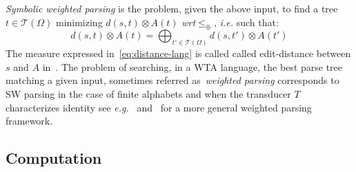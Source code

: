 \documentclass[runningheads]{llncs}
\def\ie{\textit{i.e.}\xspace}
\def\eg{\textit{e.g.}\xspace}
\def\wrt{\textit{wrt}\xspace}
\def\<#1>{\langle #1 \rangle}
\newcommand{\T}{\mathcal{T}}
\newcommand{\zero}{\mathbb{0}}
\newcommand{\one}{\mathbb{1}}
\def\SWTA{\textsf{swTA}\xspace}
\def\SWVPA{\textsf{sw-VPA}\xspace}
\def\wei{\mathsf{w}}
\def\Omegai{{\Omega_\mathsf{i}}}
\def\Omegac{{\Omega_\mathsf{c}}}
\def\Omegar{{\Omega_\mathsf{r}}}
\begin{document}
\noindent 
\emph{Symbolic weighted parsing} is the problem, 
given the above input, 
to find a tree $t \in \T(\Omega)$ %
minimizing \( d(s, t) \otimes A(t)\)
\wrt $\leq_\oplus$, 
\ie such that: %
%
\begin{equation}\label{eq:distance-lang}
d(s, t) \otimes A(t) = \displaystyle\bigoplus_{t' \in \T(\Omega)} d(s, t') \otimes A(t') 
\end{equation}
%
The measure expressed in~\eqref{eq:distance-lang} is called
called edit-distance between $s$ and $A$ in~\cite{Mohri03EDWA}.
%
%
The problem of searching, in a WTA language, 
the best parse tree matching a given input,  
sometimes referred as~\emph{weighted parsing}
corresponds to SW parsing in the case of finite alphabets
and when the transducer $T$ characterizes identity
see \eg~\cite{Goodman99SemiringParsing} 
and~\cite{MorbitzVogler19weighted-parsing} for a more general 
weighted parsing framework.
%


\subsection{Computation}
\end{document}
